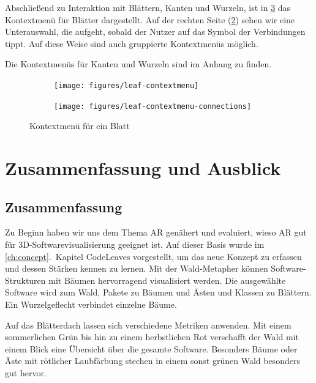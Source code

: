 \endgroup

Abschließend zu Interaktion mit Blättern, Kanten und Wurzeln, ist in \ref{fig:leaf-contextmenu} das Kontextmenü für  Blätter dargestellt. Auf der rechten Seite (\ref{fig:leaf-contextmenu-connections}) sehen wir eine Unterauswahl, die aufgeht, sobald der Nutzer auf das Symbol der Verbindungen tippt. Auf diese Weise sind auch gruppierte Kontextmenüs möglich.

Die Kontextmenüs für Kanten und Wurzeln sind im Anhang zu finden.

\begin{figure}[htb]
  \centering
  \begin{subfigure}[b]{\fwidth}
    \centering
    \texttt{[image: figures/leaf-contextmenu]}
     \label{fig:leaf-contextmenu-initial}
  \end{subfigure}
  \hfill
  \begin{subfigure}[b]{\fwidth}
    \centering
  	\texttt{[image: figures/leaf-contextmenu-connections]}
  	 \label{fig:leaf-contextmenu-connections}
  \end{subfigure}
  \caption{Kontextmenü für ein Blatt} \label{fig:leaf-contextmenu}
\end{figure}

\chapter{Zusammenfassung und Ausblick}
\label{ch:conclusion}

\section{Zusammenfassung}

Zu Beginn haben wir uns dem Thema AR genähert und evaluiert, wieso AR gut für 3D-Softwarevisualisierung geeignet ist. Auf dieser Basis wurde im \ref{ch:concept}.\ Kapitel CodeLeaves vorgestellt, um das neue Konzept zu erfassen und dessen Stärken kennen zu lernen. Mit der Wald-Metapher können Software-Strukturen mit Bäumen hervorragend visualisiert werden. Die ausgewählte Software wird zum Wald, Pakete zu Bäumen und Ästen und Klassen zu Blättern. Ein Wurzelgeflecht verbindet einzelne Bäume.

Auf das Blätterdach lassen sich verschiedene Metriken anwenden. Mit einem sommerlichen Grün bis hin zu einem herbstlichen Rot verschafft der Wald mit einem Blick eine Übersicht über die gesamte Software. Besonders Bäume oder Äste mit rötlicher Laubfärbung stechen in einem sonst grünen Wald besonders gut hervor.

